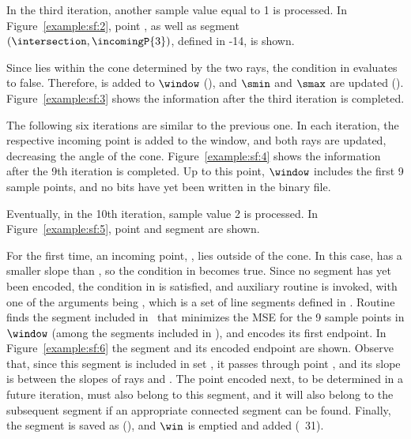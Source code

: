 \vspace{+5pt}


In the third iteration, another sample value equal to 1 is processed. In Figure~\ref{example:sf:2}, point , as well as segment $(\intersection,\incomingP{3})$, defined in -14, is shown.


\vspace{+5pt}


\clearpage


Since  lies within the cone determined by the two rays, the condition in  evaluates to false. Therefore,  is added to $\window$ (), and $\smin$ and $\smax$ are updated (). Figure~\ref{example:sf:3} shows the information after the third iteration is completed. 


\vspace{+5pt}


The following six iterations are similar to the previous one. In each iteration, the respective incoming point is added to the window, and both rays are updated, decreasing the angle of the cone. Figure~\ref{example:sf:4} shows the information after the 9th iteration is completed. Up to this point, $\window$ includes the first 9 sample points, and no bits have yet been written in the binary file. 


\vspace{+5pt}


\clearpage


Eventually, in the 10th iteration, sample value 2 is processed. In Figure~\ref{example:sf:5}, point  and segment  are shown.




For the first time, an incoming point, , lies outside of the cone. In this case,  has a smaller slope than \smin, so the condition in  becomes true. Since no segment has yet been encoded, the condition in  is satisfied, and auxiliary routine \SFWinStart is invoked, with one of the arguments being \segmentSet, which is a set of line segments defined in . Routine \SFWinStart finds the segment included in \segmentSet\ that minimizes the MSE for the 9 sample points in $\window$ (among the segments included in \segmentSet), and encodes its first endpoint. In Figure~\ref{example:sf:6} the segment and its encoded endpoint are shown. Observe that, since this segment is included in set \segmentSet, it passes through point \interPoint, and its slope is between the slopes of rays \smin and \smax. The point encoded next, to be determined in a future iteration, must also belong to this segment, and it will also belong to the subsequent segment if an appropriate connected segment can be found. Finally, the segment is saved as \segmentLastT (), and $\win$ is emptied and added  (\Line~31).


